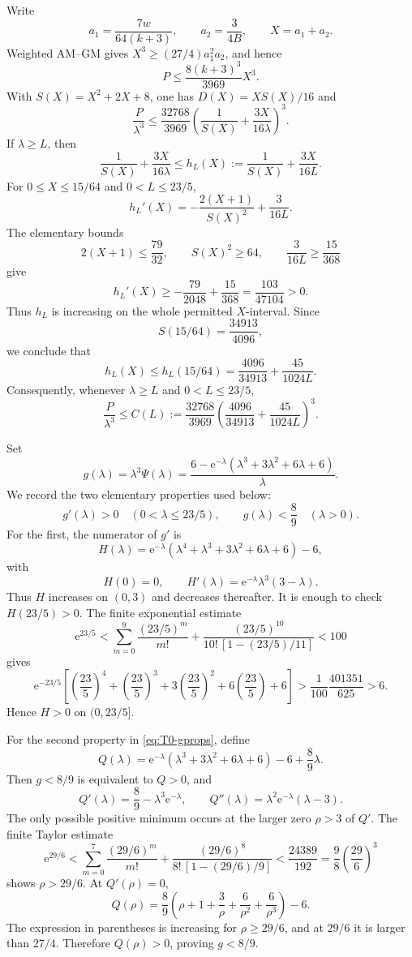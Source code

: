 \documentclass[11pt]{amsart}
\theoremstyle{definition}
\newcommand{\e}{\mathrm e}
\begin{document}
Write
\[
 a_1=\frac{7w}{64(k+3)},
 \qquad
 a_2=\frac3{4B},
 \qquad X=a_1+a_2.
\]
Weighted AM--GM gives $X^3\ge(27/4)a_1^2a_2$, and hence
\[
 P\le\frac{8(k+3)^3}{3969}X^3.
\]
With $S(X)=X^2+2X+8$, one has $D(X)=XS(X)/16$ and
\[
 \frac{P}{\lambda^3}
 \le\frac{32768}{3969}
 \left(\frac1{S(X)}+\frac{3X}{16\lambda}\right)^3.
\]
If $\lambda\ge L$, then
\[
 \frac1{S(X)}+\frac{3X}{16\lambda}
 \le h_L(X):=\frac1{S(X)}+\frac{3X}{16L}.
\]
For $0\le X\le15/64$ and $0<L\le23/5$,
\[
 h_L'(X)
 =-\frac{2(X+1)}{S(X)^2}+\frac{3}{16L}.
\]
The elementary bounds
\[
 2(X+1)\le\frac{79}{32},
 \qquad
 S(X)^2\ge64,
 \qquad
 \frac3{16L}\ge\frac{15}{368}
\]
give
\[
 h_L'(X)
 \ge-\frac{79}{2048}+\frac{15}{368}
 =\frac{103}{47104}>0.
\]
Thus $h_L$ is increasing on the whole permitted $X$-interval.  Since
\[
 S(15/64)=\frac{34913}{4096},
\]
we conclude that
\[
 h_L(X)
 \le h_L(15/64)
 =\frac{4096}{34913}+\frac{45}{1024L}.
\]
Consequently, whenever $\lambda\ge L$ and $0<L\le23/5$,
\begin{equation}\label{eq:T0-C}
 \frac{P}{\lambda^3}
 \le C(L):=\frac{32768}{3969}
 \left(\frac{4096}{34913}+\frac{45}{1024L}\right)^3.
\end{equation}

Set
\[
 g(\lambda)=\lambda^3\Psi(\lambda)
 =\frac{6-\e^{-\lambda}(\lambda^3+3\lambda^2+6\lambda+6)}{\lambda}.
\]
We record the two elementary properties used below:
\begin{equation}\label{eq:T0-gprops}
 g'(\lambda)>0\quad(0<\lambda\le23/5),
 \qquad
 g(\lambda)<\frac89\quad(\lambda>0).
\end{equation}
For the first, the numerator of $g'$ is
\[
 H(\lambda)=
 \e^{-\lambda}(\lambda^4+\lambda^3+3\lambda^2+6\lambda+6)-6,
\]
with
\[
 H(0)=0,
 \qquad
 H'(\lambda)=\e^{-\lambda}\lambda^3(3-\lambda).
\]
Thus $H$ increases on $(0,3)$ and decreases thereafter.  It is enough to check $H(23/5)>0$.  The finite exponential estimate
\[
 \e^{23/5}<
 \sum_{m=0}^{9}\frac{(23/5)^m}{m!}
 +\frac{(23/5)^{10}}{10!\,[1-(23/5)/11]}<100
\]
gives
\[
 \e^{-23/5}
 \left[
 \left(\frac{23}{5}\right)^4+
 \left(\frac{23}{5}\right)^3+
 3\left(\frac{23}{5}\right)^2+
 6\left(\frac{23}{5}\right)+6
 \right]
 >\frac1{100}\frac{401351}{625}>6.
\]
Hence $H>0$ on $(0,23/5]$.

For the second property in \eqref{eq:T0-gprops}, define
\[
 Q(\lambda)=
 \e^{-\lambda}(\lambda^3+3\lambda^2+6\lambda+6)
 -6+\frac89\lambda.
\]
Then $g<8/9$ is equivalent to $Q>0$, and
\[
 Q'(\lambda)=\frac89-\lambda^3\e^{-\lambda},
 \qquad
 Q''(\lambda)=\lambda^2\e^{-\lambda}(\lambda-3).
\]
The only possible positive minimum occurs at the larger zero $\rho>3$ of $Q'$.  The finite Taylor estimate
\[
 \e^{29/6}<
 \sum_{m=0}^{7}\frac{(29/6)^m}{m!}
 +\frac{(29/6)^8}{8!\,[1-(29/6)/9]}
 <\frac{24389}{192}
 =\frac98\left(\frac{29}{6}\right)^3
\]
shows $\rho>29/6$.  At $Q'(\rho)=0$,
\[
 Q(\rho)=\frac89
 \left(\rho+1+\frac3\rho+\frac6{\rho^2}+\frac6{\rho^3}\right)-6.
\]
The expression in parentheses is increasing for $\rho\ge29/6$, and at $29/6$ it is larger than $27/4$.  Therefore $Q(\rho)>0$, proving $g<8/9$.
\end{document}
